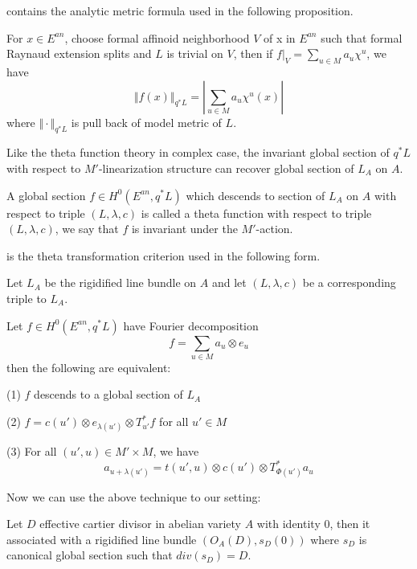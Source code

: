 \documentclass[10pt,a4paper]{amsart}
\theoremstyle{plain}
\theoremstyle{plain}
\numberwithin{equation}{section}
\begin{document}
\cite[Section~3.6]{Ku1} contains the analytic metric formula used in the
following proposition.
\begin{prop}
	For $x\in E^{an}$, choose formal affinoid neighborhood $V$ of x in $E^{an}$ such that formal Raynaud extension splits and $L$ is trivial on $V$, then if $f|_V=\sum_{u\in M}a_u\chi^u$, we have 
	$$\Vert f(x)\Vert_{q^*L}=|\sum_{u\in M}a_u\chi^u(x)|$$
	where $\Vert \cdot \Vert_{q^*L}$ is pull back of model metric of $L$.
\end{prop}
Like the theta function theory in complex case, the invariant global section of $q^*L$ with respect to $M'$-linearization structure can recover global section of $L_A$ on $A$.
\begin{defn}
	A global section $f\in H^0(E^{an},q^*L)$ which descends to section of $L_A$ on $A$ with respect to triple $(L,\lambda,c)$ is called a theta function with respect to triple $(L,\lambda,c)$, we say that $f$ is invariant under the $M'$-action. 
\end{defn}
\cite[Proposition~3.13]{Ku1} is the theta transformation criterion used in
the following form.
\begin{prop}
	Let $L_A$ be the rigidified line bundle on $A$ and let $(L,\lambda,c)$ be a corresponding triple to $L_A$.
	
	
	Let $f\in H^0(E^{an},q^*L)$ have Fourier decomposition 
	$$f=\sum_{u\in M}a_u\otimes e_u$$ 
	then the following are equivalent: 
	
	
	(1) $f$ descends to a global section of $L_A$
	
	
	(2) $f=c(u')\otimes e_{\lambda(u')}\otimes T^*_{u'}f$ for all $u'\in M$ 
	
	
	(3) For all $(u',u)\in M'\times M$, we have 
	$$a_{u+\lambda(u')}=t(u',u)\otimes c(u') \otimes T^*_{\Phi(u')}a_u$$
\end{prop}
Now we can use the above technique to our setting:


Let $D$ effective cartier divisor in abelian variety $A$ with identity 0, then it associated with a rigidified line bundle $(O_A(D),s_D(0))$ where $s_D$ is canonical global section such that $div(s_D)=D$.
\end{document}
